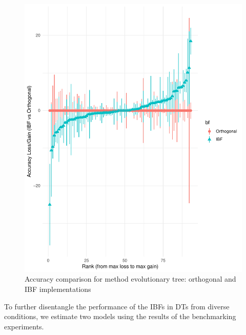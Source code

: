 \documentclass[]{elsarticle} %
\makeatletter
\def\maxwidth{\ifdim\Gin@nat@width>\linewidth\linewidth
\else\Gin@nat@width\fi}
\let\Oldincludegraphics\includegraphics
\renewcommand{\includegraphics}[1]{\Oldincludegraphics[width=\maxwidth]{#1}}
\makeatother
\begin{document}
\begin{figure}
\centering
\includegraphics{Trees_with_Base_Functions_v3_files/figure-latex/fig11-accuracy-ev-1.pdf}
\caption{\label{fig:fig11-accuracy-ev}Accuracy comparison for method
evolutionary tree: orthogonal and IBF implementations}
\end{figure}

To further disentangle the performance of the IBFs in DTs from diverse
conditions, we estimate two models using the results of the benchmarking
experiments.
\end{document}

